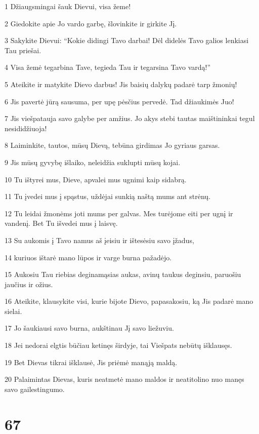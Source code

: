 \par 1 Džiaugsmingai šauk Dievui, visa žeme! 
\par 2 Giedokite apie Jo vardo garbę, šlovinkite ir girkite Jį. 
\par 3 Sakykite Dievui: “Kokie didingi Tavo darbai! Dėl didelės Tavo galios lenkiasi Tau priešai. 
\par 4 Visa žemė tegarbina Tave, tegieda Tau ir tegarsina Tavo vardą!” 
\par 5 Ateikite ir matykite Dievo darbus! Jis baisių dalykų padarė tarp žmonių! 
\par 6 Jis pavertė jūrą sausuma, per upę pėsčius pervedė. Tad džiaukimės Juo! 
\par 7 Jis viešpatauja savo galybe per amžius. Jo akys stebi tautas­ maištininkai tegul nesididžiuoja! 
\par 8 Laiminkite, tautos, mūsų Dievą, tebūna girdimas Jo gyriaus garsas. 
\par 9 Jis mūsų gyvybę išlaiko, neleidžia suklupti mūsų kojai. 
\par 10 Tu ištyrei mus, Dieve, apvalei mus ugnimi kaip sidabrą. 
\par 11 Tu įvedei mus į spąstus, uždėjai sunkią naštą mums ant strėnų. 
\par 12 Tu leidai žmonėms joti mums per galvas. Mes turėjome eiti per ugnį ir vandenį. Bet Tu išvedei mus į laisvę. 
\par 13 Su aukomis į Tavo namus aš įeisiu ir ištesėsiu savo įžadus, 
\par 14 kuriuos ištarė mano lūpos ir varge burna pažadėjo. 
\par 15 Aukosiu Tau riebias deginamąsias aukas, avinų taukus deginsiu, paruošiu jaučius ir ožius. 
\par 16 Ateikite, klausykite visi, kurie bijote Dievo, papasakosiu, ką Jis padarė mano sielai. 
\par 17 Jo šaukiausi savo burna, aukštinau Jį savo liežuviu. 
\par 18 Jei nedorai elgtis būčiau ketinęs širdyje, tai Viešpats nebūtų išklausęs. 
\par 19 Bet Dievas tikrai išklausė, Jis priėmė manąją maldą. 
\par 20 Palaimintas Dievas, kuris neatmetė mano maldos ir neatitolino nuo manęs savo gailestingumo.



\chapter{67}


